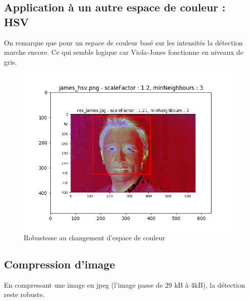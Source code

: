 \documentclass[a4paper,11pt]{article}
\begin{document}
    \subsection{Application à un autre espace de couleur : HSV}
	
	On remarque que pour un espace de couleur basé sur les intensités la détection marche
	encore. Ce qui semble logique car Viola-Jones fonctionne en niveaux de gris.
	    
	    \begin{figure}[H]
	        \begin{center}
	           \includegraphics[scale = 0.6]{images/james_hsv_1,2_3.png}
	           \caption{Robustesse au changement d'espace de couleur}
	           \label{fig:hsv}
	        \end{center}
	    \end{figure}
	
    
    \subsection{Compression d'image}

	En compressant une image en jpeg (l'image passe de 29 kB à 4kB), la détection reste robuste.
\end{document}
